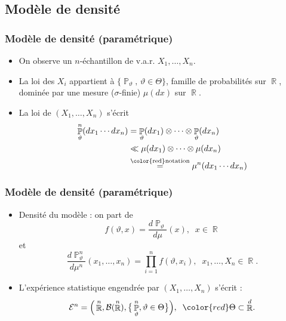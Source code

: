 ﻿\documentclass{beamer}
\DeclareMathOperator{\R}{{\mathbb R}}
\DeclareMathOperator{\PP}{{\mathbb P}}
\begin{document}
\subsection{Modèle de densité}

\begin{frame}
\frametitle{Modèle de densité (paramétrique)}
\begin{itemize}
\item On observe un $n$-échantillon de v.a.r. $X_1,\ldots, X_n$.
\item La loi des $X_i$ appartient à
$\{\PP_\vartheta,\,\vartheta \in \Theta\}$, famille de {\color{red}probabilités sur $\R$}, {\color{red} dominée} par une mesure ($\sigma$-finie) $\mu(dx)$ sur $\R$.
\item La loi de $(X_1,\ldots,X_n)$ s'écrit
\begin{align*}
\PP_\vartheta^n(dx_1\cdots dx_n) & = \PP_\vartheta(dx_1)\otimes \cdots \otimes \PP_\vartheta(dx_n) \\
& \ll  \mu(dx_1)\otimes \cdots \otimes \mu(dx_n) \\
& \stackrel{\text{{\color{red}notation}}}{=} \mu^n(dx_1\cdots dx_n)
\end{align*}
\end{itemize}
\end{frame}

\begin{frame}
\frametitle{Modèle de densité (paramétrique)}
\begin{itemize}
\item {\color{red} Densité du modèle} : on part de
$$f(\vartheta,x)=\frac{d\PP_\vartheta}{d\mu}(x),\;\;x\in \R$$
et
$$\frac{d\PP_\vartheta^n}{d\mu^{n}}(x_1,\ldots, x_n) = \prod_{i = 1}^n f(\vartheta,x_i),\;\;x_1,\ldots, X_n \in \R.$$
\item  {\color{red}L'expérience statistique} engendrée par $(X_1,\ldots, X_n)$ s'écrit :
$${\mathcal E}^n = \Big(\R^n, {\mathcal B}(\R^n), \big\{\PP_\vartheta^n,\vartheta \in \Theta\big\}\Big),\;\;{\color{red}\Theta \subset \R^d}.$$
\end{itemize}
\end{frame}
\end{document}

